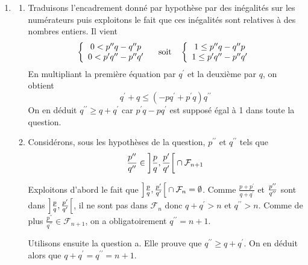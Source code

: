 \begin{enumerate}
\item
\begin{enumerate}
\item  Traduisons l'encadrement donn{\'e} par hypoth{\`e}se par des in{\'e}galit{\'e}s sur les num{\'e}rateurs puis exploitons le fait que ces
in{\'e}galit{\'e}s sont relatives {\`a} des nombres entiers. Il vient
\[
\left\{
\begin{array}{c}
0<p^{\prime \prime }q-q^{\prime \prime }p \\
0<p^{\prime }q^{\prime \prime }-p^{\prime \prime }q^{\prime }
\end{array}
\right. \quad \text{soit\quad }\left\{
\begin{array}{c}
1\leq p^{\prime \prime }q-q^{\prime \prime }p \\
1\leq p^{\prime }q^{\prime \prime }-p^{\prime \prime }q^{\prime }
\end{array}
\right.
\]
En multipliant la premi{\`e}re {\'e}quation par $q^{\prime }$ et la
deuxi{\`e}me par $q$, on obtient
\[
q^{\prime }+q\leq (-pq^{\prime }+p^{\prime }q)q^{\prime \prime }
\]
On en d{\'e}duit $q^{\prime \prime }\geq q+q^{\prime }$ car $p^{\prime
}q-pq^{\prime }$ est suppos{\'e} {\'e}gal {\`a} 1 dans toute la question.

\item  Consid{\'e}rons, sous les hypoth{\`e}ses de la question, $p^{\prime
\prime }$ et $q^{\prime \prime }$ tels que
\[
\frac{p^{\prime \prime }}{q^{\prime \prime }}\in \left] \frac{p}{q},\frac{%
p^{\prime }}{q^{\prime }}\right[ \cap \mathcal{F}_{n+1}
\]

Exploitons d'abord le fait que $\left] \frac{p}{q},\frac{p^{\prime }}{%
q^{\prime }}\right[ \cap \mathcal{F}_{n}=\emptyset $.\newline
Comme $\frac{p+p^{\prime }}{q+q^{\prime }}$ et $\frac{p^{\prime \prime }}{%
q^{\prime \prime }}$ sont dans $\left] \frac{p}{q},\frac{p^{\prime }}{%
q^{\prime }}\right[ $, il ne sont pas dans $\mathcal{F}_{n}$ donc $%
q+q^{\prime }>n$ et $q^{\prime \prime }>n$.\newline
Comme de plus $\frac{p^{\prime \prime }}{q^{\prime \prime }}\in \mathcal{F}%
_{n+1}$, on a obligatoirement $q^{\prime \prime }=n+1$.

Utilisons ensuite la question a. Elle prouve que $q^{\prime \prime }\geq q+q^{\prime }$. On en d{\'e}duit alors  que $q+q^{\prime }=q^{\prime \prime}=n+1$.


\end{enumerate}
\end{enumerate}
